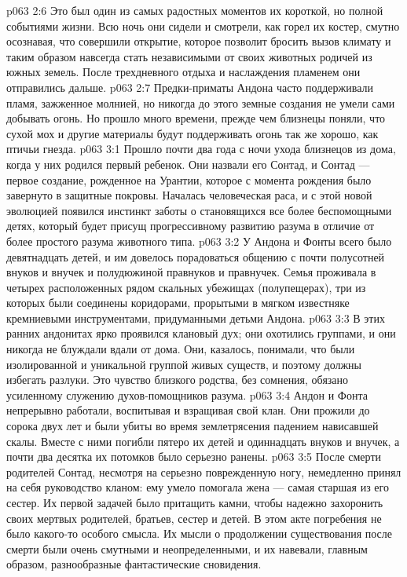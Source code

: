 \vs p063 2:6 Это был один из самых радостных моментов их короткой, но полной событиями жизни. Всю ночь они сидели и смотрели, как горел их костер, смутно осознавая, что совершили открытие, которое позволит бросить вызов климату и таким образом навсегда стать независимыми от своих животных родичей из южных земель. После трехдневного отдыха и наслаждения пламенем они отправились дальше.
\vs p063 2:7 Предки\hyp{}приматы Андона часто поддерживали пламя, зажженное молнией, но никогда до этого земные создания не умели сами добывать огонь. Но прошло много времени, прежде чем близнецы поняли, что сухой мох и другие материалы будут поддерживать огонь так же хорошо, как птичьи гнезда.
\vs p063 3:1 Прошло почти два года с ночи ухода близнецов из дома, когда у них родился первый ребенок. Они назвали его Сонтад, и Сонтад --- первое создание, рожденное на Урантии, которое с момента рождения было завернуто в защитные покровы. Началась человеческая раса, и с этой новой эволюцией появился инстинкт заботы о становящихся все более беспомощными детях, который будет присущ прогрессивному развитию разума в отличие от более простого разума животного типа.
\vs p063 3:2 У Андона и Фонты всего было девятнадцать детей, и им довелось порадоваться общению с почти полусотней внуков и внучек и полудюжиной правнуков и правнучек. Семья проживала в четырех расположенных рядом скальных убежищах (полупещерах), три из которых были соединены коридорами, прорытыми в мягком известняке кремниевыми инструментами, придуманными детьми Андона.
\vs p063 3:3 В этих ранних андонитах ярко проявился клановый дух; они охотились группами, и они никогда не блуждали вдали от дома. Они, казалось, понимали, что были изолированной и уникальной группой живых существ, и поэтому должны избегать разлуки. Это чувство близкого родства, без сомнения, обязано усиленному служению духов\hyp{}помощников разума.
\vs p063 3:4 \pc Андон и Фонта непрерывно работали, воспитывая и взращивая свой клан. Они прожили до сорока двух лет и были убиты во время землетрясения падением нависавшей скалы. Вместе с ними погибли пятеро их детей и одиннадцать внуков и внучек, а почти два десятка их потомков было серьезно ранены.
\vs p063 3:5 После смерти родителей Сонтад, несмотря на серьезно поврежденную ногу, немедленно принял на себя руководство кланом: ему умело помогала жена --- самая старшая из его сестер. Их первой задачей было притащить камни, чтобы надежно захоронить своих мертвых родителей, братьев, сестер и детей. В этом акте погребения не было какого\hyp{}то особого смысла. Их мысли о продолжении существования после смерти были очень смутными и неопределенными, и их навевали, главным образом, разнообразные фантастические сновидения.

